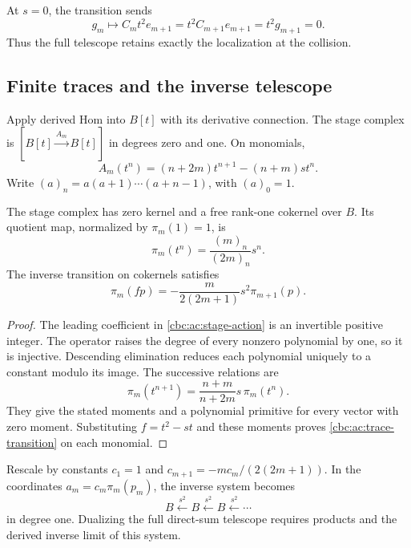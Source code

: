 At $s=0$, the transition sends
\[
 g_m\longmapsto C_m t^2e_{m+1}
                 =t^2C_{m+1}e_{m+1}=t^2g_{m+1}=0.
\]
Thus the full telescope retains exactly the
localization at the collision.

\subsection{Finite traces and the inverse telescope}

Apply derived Hom into $B[t]$ with its derivative
connection. The stage complex is
$[B[t]\xrightarrow{A_m}B[t]]$ in degrees zero and one.
On monomials,
\begin{equation}\label{cbc:ac:stage-action}
 A_m(t^n)=(n+2m)t^{n+1}-(n+m)s t^n.
\end{equation}
Write $(a)_n=a(a+1)\cdots(a+n-1)$, with $(a)_0=1$.

\begin{lemma}\label{cbc:ac:finite-trace}
The stage complex has zero kernel and a free rank-one
cokernel over $B$. Its quotient map, normalized by
$\pi_m(1)=1$, is
\[
 \pi_m(t^n)=\frac{(m)_n}{(2m)_n}s^n.
\]
The inverse transition on cokernels satisfies
\begin{equation}\label{cbc:ac:trace-transition}
 \pi_m(fp)=-\frac{m}{2(2m+1)}s^2\pi_{m+1}(p).
\end{equation}
\end{lemma}
\begin{proof}
The leading coefficient in \eqref{cbc:ac:stage-action}
is an invertible positive integer. The operator
raises the degree of every nonzero polynomial by one,
so it is injective. Descending elimination reduces
each polynomial uniquely to a constant modulo its
image. The successive relations are
\[
 \pi_m(t^{n+1})
       =\frac{n+m}{n+2m}s\,\pi_m(t^n).
\]
They give the stated moments and a polynomial
primitive for every vector with zero moment.
Substituting $f=t^2-st$ and these moments proves
\eqref{cbc:ac:trace-transition} on each monomial.
\end{proof}

Rescale by constants $c_1=1$ and
$c_{m+1}=-m c_m/(2(2m+1))$.
In the coordinates $a_m=c_m\pi_m(p_m)$, the
inverse system becomes
\[
 B\xleftarrow{s^2}B\xleftarrow{s^2}B
                           \xleftarrow{s^2}\cdots
\]
in degree one. Dualizing the full direct-sum telescope
requires products and the derived inverse limit of
this system.

